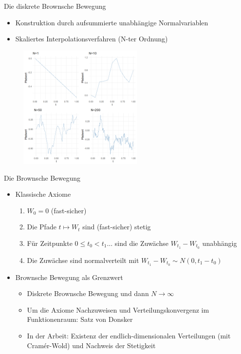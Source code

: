 \documentclass{beamer}
\begin{document}
\begin{frame}{Die diskrete Brownsche Bewegung}
  \begin{itemize}
    \item Konstruktion durch aufsummierte unabhängige Normalvariablen
    \item Skaliertes Interpolationsverfahren (N-ter Ordnung)
  \end{itemize}
  \begin{figure}
    \centering
  \includegraphics[width=0.55\textwidth]{../thesis/images/disrete_bb.png}
  \end{figure}
\end{frame}

\begin{frame}{Die Brownsche Bewegung}
  \begin{itemize}
  \item Klassische Axiome
    \begin{enumerate}
      \item $W_0=0$ (fast-sicher)
      \item Die Pfade $t \mapsto W_t$ sind (fast-sicher) stetig
      \item Für Zeitpunkte $0 \le t_0 < t_1 \dots$ sind die Zuwächse $W_{t_1} - W_{t_0}$ unabhängig
      \item Die Zuwächse sind normalverteilt mit $W_{t_1} - W_{t_0} \sim N(0, t_1 - t_0)$
    \end{enumerate}
  \pause
  \item Brownsche Bewegung als Grenzwert
    \begin{itemize}
      \item Diskrete Brownsche Bewegung und dann $N \to \infty$
      \item Um die Axiome Nachzuweisen und Verteilungskonvergenz im Funktionenraum: Satz von Donsker
      \item In der Arbeit: Existenz der endlich-dimensionalen Verteilungen (mit Cramér-Wold) und Nachweis der Stetigkeit
    \end{itemize}
\end{itemize}
\end{frame}
\end{document}
